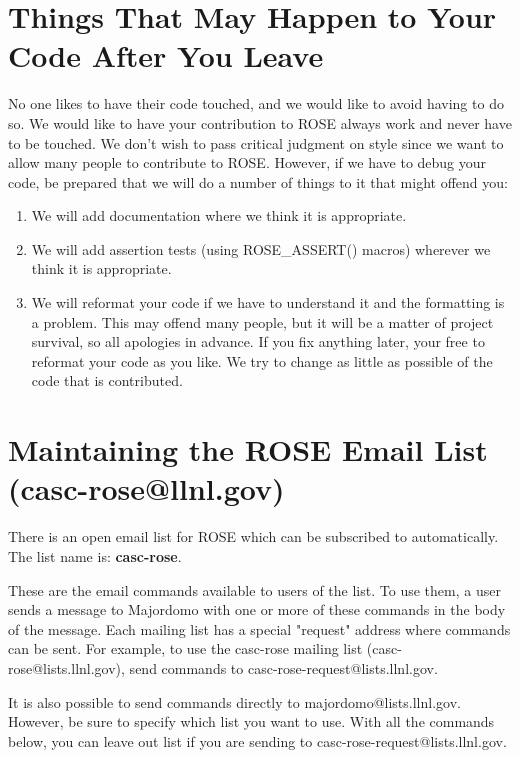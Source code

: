 \section{Things That May Happen to Your Code After You Leave}

    No one likes to have their code touched, and we would like to
avoid having to do so. We would like to have your contribution to ROSE
always work and never have to be touched.  We don't wish to pass
critical judgment on style since we want to allow many people to 
contribute to ROSE.  However, if we have to debug your code, be prepared 
that we will do a number of things to it that might offend you:
\begin{enumerate}
   \item We will add documentation where we think it is appropriate.
   \item We will add assertion tests (using ROSE\_ASSERT() macros)
         wherever we think it is appropriate.
   \item We will reformat your code if we have to understand it and the 
         formatting is a problem.  This may offend
         many people, but it will be a matter of project survival,
         so all apologies in advance.  If you fix
         anything later, your free to reformat your code as you like.  We try to change
         as little as possible of the code that is contributed.
\end{enumerate}


\section{Maintaining the ROSE Email List (casc-rose@llnl.gov)}

   There is an open email list for ROSE which can be subscribed to
automatically.  The list name is: {\bf casc-rose}.

   These are the email commands available to users of the list. To use them,
a user sends a message to Majordomo with one or more of these commands in the body of
the message. Each mailing list has a special "request" address where commands can be
sent. For example, to use the casc-rose mailing list (casc-rose@lists.llnl.gov), send
commands to casc-rose-request@lists.llnl.gov.

   It is also possible to send commands directly to majordomo@lists.llnl.gov. 
However, be sure to specify which list you want to use. With all the commands below, you 
can leave out list if you are sending to casc-rose-request@lists.llnl.gov.

